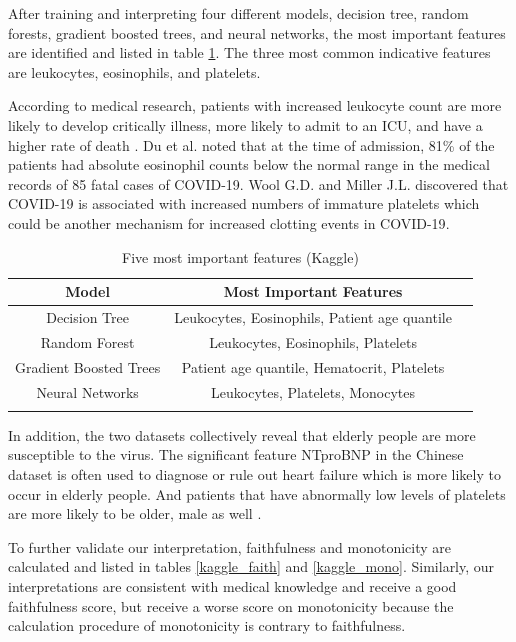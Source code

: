 After training and interpreting four different models, decision tree, random forests, gradient boosted trees, and neural networks, the most important features are identified and listed in table \ref{tab:important_feature_kaggle}. The three most common indicative features are leukocytes, eosinophils, and platelets.

According to medical research, patients with increased leukocyte count are more likely to develop critically illness, more likely to admit to an ICU, and have a higher rate of death \cite{zhao2020clinical}. Du et al. noted that at the time of admission, 81\% of the patients had absolute eosinophil counts below the normal range in the medical records of 85 fatal cases of COVID-19\cite{du2020clinical}. Wool G.D. and Miller J.L. discovered that COVID-19 is associated with increased numbers of immature platelets which could be another mechanism for increased clotting events in COVID-19\cite{wool2021impact}.

\begin{table}[H]
\centering
\caption{Five most important features (Kaggle)}
\begin{tabular}{@{}ccc@{}}
\toprule
Model                   & Most Important Features \\ \midrule
Decision Tree           & Leukocytes, Eosinophils, Patient age quantile      \\
Random Forest           & Leukocytes, Eosinophils, Platelets        \\
Gradient Boosted Trees  & Patient age quantile, Hematocrit, Platelets  \\
Neural Networks         & Leukocytes, Platelets, Monocytes          \\  \bottomrule
\label{tab:important_feature_kaggle}
\end{tabular}
\end{table}

In addition, the two datasets collectively reveal that elderly people are more susceptible to the virus. The significant feature NTproBNP in the Chinese dataset is often used to diagnose or rule out heart failure which is more likely to occur in elderly people. And patients that have abnormally low levels of platelets are more likely to be older, male as well \cite{wool2021impact}.
\color{black}

To further validate our interpretation, faithfulness and monotonicity are calculated and listed in tables \ref{kaggle_faith} and \ref{kaggle_mono}. Similarly, our interpretations are consistent with medical knowledge and receive a good faithfulness score, but receive a worse score on monotonicity because the calculation procedure of monotonicity is contrary to faithfulness.

